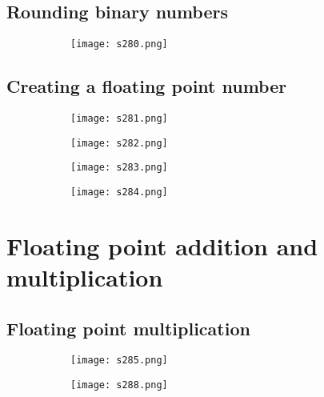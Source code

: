 \documentclass[8pt]{extreport}
\begin{document}
\subsection{Rounding binary numbers}
\begin{figure}[H]
\centering
\begin{subfigure}[b]{0.4\linewidth}
\texttt{[image: s280.png]}
\end{subfigure}
\end{figure}

\subsection{Creating a floating point number}
\begin{figure}[H]
\centering
\begin{subfigure}[b]{0.4\linewidth}
\texttt{[image: s281.png]}
\end{subfigure}
\begin{subfigure}[b]{0.4\linewidth}
\texttt{[image: s282.png]}
\end{subfigure}
\begin{subfigure}[b]{0.4\linewidth}
\texttt{[image: s283.png]}
\end{subfigure}
\begin{subfigure}[b]{0.4\linewidth}
\texttt{[image: s284.png]}
\end{subfigure}
\end{figure}

\section{Floating point addition and multiplication}

\subsection{Floating point multiplication}
\begin{figure}[H]
\centering
\begin{subfigure}[b]{0.4\linewidth}
\texttt{[image: s285.png]}
\end{subfigure}
\begin{subfigure}[b]{0.4\linewidth}
\texttt{[image: s288.png]}
\end{subfigure}
\end{figure}
\end{document}
